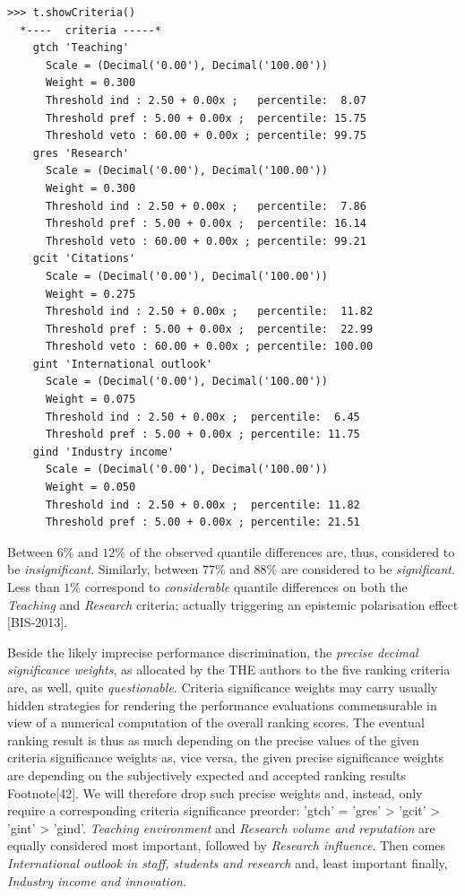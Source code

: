 \begin{lstlisting}[caption={Inspecting the performance discrimination thresholds},label=list:13.6]
>>> t.showCriteria()
  *----  criteria -----*
    gtch 'Teaching'
      Scale = (Decimal('0.00'), Decimal('100.00'))
      Weight = 0.300 
      Threshold ind : 2.50 + 0.00x ;   percentile:  8.07
      Threshold pref : 5.00 + 0.00x ;  percentile: 15.75
      Threshold veto : 60.00 + 0.00x ; percentile: 99.75
    gres 'Research'
      Scale = (Decimal('0.00'), Decimal('100.00'))
      Weight = 0.300 
      Threshold ind : 2.50 + 0.00x ;   percentile:  7.86
      Threshold pref : 5.00 + 0.00x ;  percentile: 16.14
      Threshold veto : 60.00 + 0.00x ; percentile: 99.21
    gcit 'Citations'
      Scale = (Decimal('0.00'), Decimal('100.00'))
      Weight = 0.275 
      Threshold ind : 2.50 + 0.00x ;   percentile:  11.82
      Threshold pref : 5.00 + 0.00x ;  percentile:  22.99
      Threshold veto : 60.00 + 0.00x ; percentile: 100.00
    gint 'International outlook'
      Scale = (Decimal('0.00'), Decimal('100.00'))
      Weight = 0.075 
      Threshold ind : 2.50 + 0.00x ;  percentile:  6.45
      Threshold pref : 5.00 + 0.00x ; percentile: 11.75
    gind 'Industry income'
      Scale = (Decimal('0.00'), Decimal('100.00'))
      Weight = 0.050 
      Threshold ind : 2.50 + 0.00x ;  percentile: 11.82
      Threshold pref : 5.00 + 0.00x ; percentile: 21.51
\end{lstlisting}

Between $6\%$ and $12\%$ of the observed quantile differences are, thus, considered to be \emph{insignificant}. Similarly, between $77\%$ and $88\%$ are considered to be \emph{significant}. Less than $1\%$ correspond to \emph{considerable} quantile differences on both the \emph{Teaching} and \emph{Research} criteria; actually triggering an epistemic polarisation effect [BIS-2013].

Beside the likely imprecise performance discrimination, the \emph{precise decimal significance weights}, as allocated by the THE authors to the five ranking criteria are, as well, quite \emph{questionable}. Criteria significance weights may carry usually hidden strategies for rendering the performance evaluations commensurable in view of a numerical computation of the overall ranking scores. The eventual ranking result is thus as much depending on the precise values of the given criteria significance weights as, vice versa, the given precise significance weights are depending on the subjectively expected and accepted ranking results Footnote[42]. We will therefore drop such precise weights and, instead, only require a corresponding criteria significance preorder: 'gtch' = 'gres' > 'gcit' > 'gint' > 'gind'. \emph{Teaching environment} and \emph{Research volume and reputation} are equally considered most important, followed by \emph{Research influence}. Then comes \emph{International outlook in staff, students and research} and, least important finally, \emph{Industry income and innovation}.

